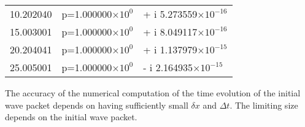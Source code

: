 \documentclass[aps,prc,reprint,noshowpacs,groupedaddress,onecolumn]{revtex4}
\begin{document}
\begin{table}
\begin{tabular}{lll}
10.202040  &p=1.000000$\times 10^0$ &+ i 5.273559$\times 10^{-16}$ \\
15.003001  &p=1.000000$\times 10^0$ &+ i 8.049117$\times 10^{-16}$ \\
20.204041  &p=1.000000$\times 10^0$&+ i 1.137979$\times 10^{-15}$ \\
25.005001  &p=1.000000$\times 10^0$ &- i 2.164935$\times 10^{-15}$\\
\hline                                          
\end{tabular} 
\end{table} 

The accuracy of the numerical computation of the time evolution of the
initial wave packet depends on having sufficiently small $\delta x$
and $\Delta t$.  The limiting size depends on the initial wave packet.
\end{document}
